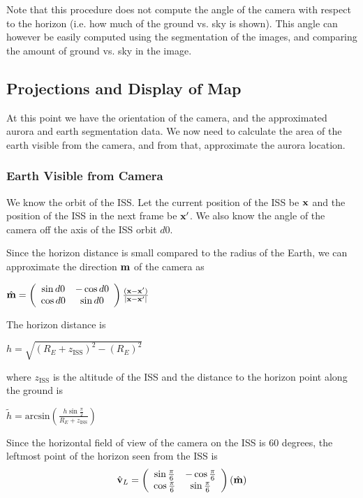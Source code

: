 \documentclass[onecolumn,preprintnumbers,amsmath,amssymb]{revtex4}
\newcommand{\beq}{\begin{equation}}
\newcommand{\eeq}{\end{equation}}
\begin{document}
Note that this procedure does not compute the angle of the camera with respect to the horizon (i.e. how much of the ground vs. sky is shown).  This angle can however be easily computed using the segmentation of the images, and comparing the amount of ground vs. sky in the image. 

\subsection{ \bf Projections and Display of Map }

At this point we have the orientation of the camera, and the approximated aurora and earth segmentation data.  We now need to calculate the area of the earth visible from the camera, and from that, approximate the aurora location.

\subsubsection{ \bf Earth Visible from Camera }

We know the orbit of the ISS. Let the current position of the ISS be $\bf{x}$ and the position of the ISS in the next frame be $\bf{x'}$. We also know the angle of the camera off the axis of the ISS orbit $d0$. 

Since the horizon distance is small compared to the radius of the Earth, we can approximate the direction $\bf{m}$ of the camera as
\begin{center}
$\hat{\bf{m}} = \left(
\begin{array}{cc}
\sin{d0} & -\cos{d0} \\
\cos{d0} & \sin{d0}\\
\end{array}
\right)
\frac{(\bf{x}- \bf{x'})}{|\bf{x}- \bf{x'}|}$
\end{center}
The horizon distance is
\begin{center}
$h = \sqrt{(R_E + z_\text{ISS})^2 - (R_E)^2}$
\end{center}
where $z_\text{ISS}$ is the altitude of the ISS
and the distance to the horizon point along the ground is
\begin{center}
$\tilde{h}= \text{arcsin}\left( \frac{h \sin{\frac{\pi}{2}} }{R_E+z_\text{ISS}}\right)$
\end{center}
Since the horizontal field of view of the camera on the ISS is 60 degrees, the leftmost point of the horizon seen from the ISS is
\beq
\hat{\bf{v}}_L = \left(
\begin{array}{cc}
\sin{\frac{\pi}{6}} & -\cos{\frac{\pi}{6}} \\
\cos{\frac{\pi}{6}} & \sin{\frac{\pi}{6}}\\
\end{array}
\right)
(\hat{\bf{m}})
\eeq
\end{document}
